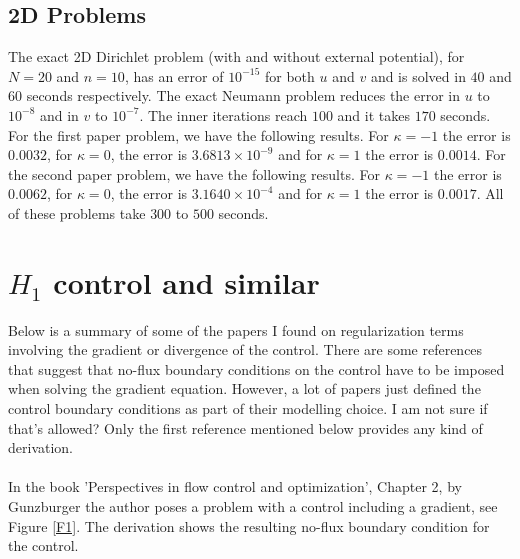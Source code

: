 \documentclass[11pt, a4paper]{article}
\theoremstyle{definition}
\begin{document}
\subsection{2D Problems}
The exact 2D Dirichlet problem (with and without external potential), for $N = 20$ and $n = 10$, has an error of $10^{-15}$ for both $u$ and $v$ and is solved in $40$ and $60$ seconds respectively. The exact Neumann problem reduces the error in $u$ to $10^{-8}$ and in $v$ to $10^{-7}$. The inner iterations reach $100$ and it takes $170$ seconds.
For the first paper problem, we have the following results. For $\kappa = -1$ the error is $0.0032$, for $\kappa = 0$, the error is $3.6813 \times 10^{-9}$ and for $\kappa = 1$ the error is $0.0014$.
For the second paper problem, we have the following results. For $\kappa = -1$ the error is $0.0062$, for $\kappa = 0$, the error is $3.1640 \times 10^{-4}$ and for $\kappa = 1$ the error is $0.0017$.
All of these problems take $300$ to $500$ seconds.
\section{$H_1$ control and similar}
Below is a summary of some of the papers I found on regularization terms involving the gradient or divergence of the control. There are some references that suggest that no-flux boundary conditions on the control have to be imposed when solving the gradient equation. However, a lot of papers just defined the control boundary conditions as part of their modelling choice. I am not sure if that's allowed? Only the first reference mentioned below provides any kind of derivation.
\\
\\
In the book 'Perspectives in flow control and optimization', Chapter 2, by Gunzburger the author poses a problem with a control including a gradient, see Figure \ref{F1}. The derivation shows the resulting no-flux boundary condition for the control.
\end{document}
